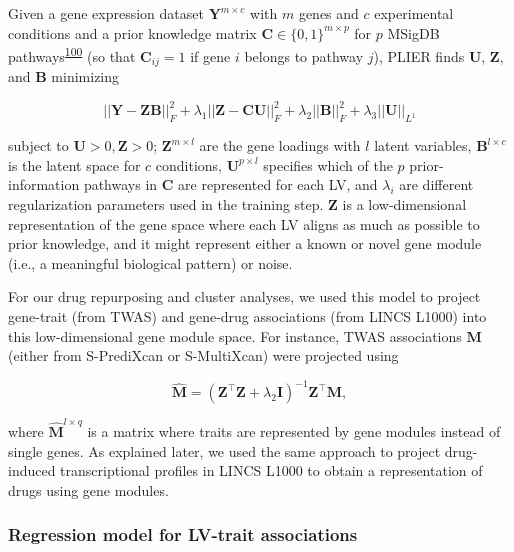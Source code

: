 \documentclass[
  a4paper,
]{article}
\begin{document}
Given a gene expression dataset \(\mathbf{Y}^{m \times c}\) with \(m\) genes and \(c\) experimental conditions and a prior knowledge matrix \(\mathbf{C} \in \{0,1\}^{m \times p}\) for \(p\) MSigDB pathways\textsuperscript{\protect\hyperlink{ref-1CbVoEpNJ}{100}} (so that \(\mathbf{C}_{ij} = 1\) if gene \(i\) belongs to pathway \(j\)), PLIER finds \(\mathbf{U}\), \(\mathbf{Z}\), and \(\mathbf{B}\) minimizing

\begin{equation}
||\mathbf{Y} - \mathbf{Z}\mathbf{B}||^{2}_{F} + \lambda_1 ||\mathbf{Z} - \mathbf{C}\mathbf{U}||^{2}_{F} + \lambda_2 ||\mathbf{B}||^{2}_{F} + \lambda_3 ||\mathbf{U}||_{L^1}
\label{eq:met:plier_func}\end{equation}

subject to \(\mathbf{U}>0, \mathbf{Z}>0\);
\(\mathbf{Z}^{m \times l}\) are the gene loadings with \(l\) latent variables,
\(\mathbf{B}^{l \times c}\) is the latent space for \(c\) conditions,
\(\mathbf{U}^{p \times l}\) specifies which of the \(p\) prior-information pathways in \(\mathbf{C}\) are represented for each LV,
and \(\lambda_i\) are different regularization parameters used in the training step.
\(\mathbf{Z}\) is a low-dimensional representation of the gene space where each LV aligns as much as possible to prior knowledge, and it might represent either a known or novel gene module (i.e., a meaningful biological pattern) or noise.

For our drug repurposing and cluster analyses, we used this model to project gene-trait (from TWAS) and gene-drug associations (from LINCS L1000) into this low-dimensional gene module space.
For instance, TWAS associations \(\mathbf{M}\) (either from S-PrediXcan or S-MultiXcan) were projected using

\begin{equation}
\hat{\mathbf{M}} = (\mathbf{Z}^{\top} \mathbf{Z} + \lambda_{2} \mathbf{I})^{-1} \mathbf{Z}^{\top} \mathbf{M},
\label{eq:proj}\end{equation}

where \(\hat{\mathbf{M}}^{l \times q}\) is a matrix where traits are represented by gene modules instead of single genes.
As explained later, we used the same approach to project drug-induced transcriptional profiles in LINCS L1000 to obtain a representation of drugs using gene modules.

\hypertarget{sec:methods:reg}{%
\subsubsection{Regression model for LV-trait associations}\label{sec:methods:reg}}
\end{document}
